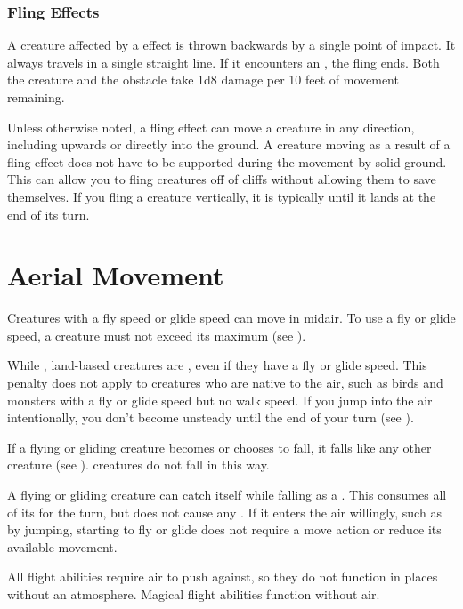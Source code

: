     \subsubsection{Fling Effects}\label{Fling Effects}
      A creature affected by a  effect is thrown backwards by a single point of impact.
      It always travels in a single straight line.
      If it encounters an , the fling ends.
      Both the creature and the obstacle take 1d8 damage per 10 feet of movement remaining.

      Unless otherwise noted, a fling effect can move a creature in any direction, including upwards or directly into the ground.
      A creature moving as a result of a fling effect does not have to be supported during the movement by solid ground.
      This can allow you to fling creatures off of cliffs without allowing them to save themselves.
      If you fling a creature vertically, it is typically \unsteady until it lands at the end of its turn.

\section{Aerial Movement}\label{Aerial Movement}
  Creatures with a fly speed or glide speed can move in midair.
  To use a fly or glide speed, a creature must not exceed its maximum  (see ).

  While , land-based creatures are \unsteady, even if they have a fly or glide speed.
  This penalty does not apply to creatures who are native to the air, such as birds and monsters with a fly or glide speed but no walk speed.
  If you jump into the air intentionally, you don't become unsteady until the end of your turn (see ).

  If a flying or gliding creature becomes \helpless or chooses to fall, it falls like any other creature (see ).
   creatures do not fall in this way.

  A flying or gliding creature can catch itself while falling as a .
  This consumes all of its  for the turn, but does not cause any .
  If it enters the air willingly, such as by jumping, starting to fly or glide does not require a move action or reduce its available movement.

  All  flight abilities require air to push against, so they do not function in places without an atmosphere.
  Magical flight abilities function without air.

